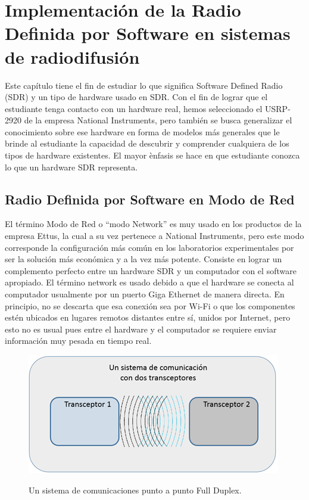 
\chapter{Implementación de la Radio Definida por Software en sistemas de radiodifusión}

Este capítulo tiene el fin de estudiar lo que significa Software Defined Radio (SDR) y un tipo de hardware usado en SDR. Con el fin de lograr que el estudiante tenga contacto con un hardware real, hemos seleccionado el USRP-2920 de la empresa National Instruments, pero también se busca generalizar el conocimiento sobre ese hardware en forma de modelos más generales que le brinde al estudiante la capacidad de descubrir y comprender cualquiera de los tipos de hardware existentes. El mayor ènfasis se hace en que estudiante conozca lo que un hardware SDR representa. 


\section{Radio Definida por Software en Modo de Red}

El término Modo de Red o “modo Network” es muy usado en los productos de la empresa Ettus, la cual a su vez pertenece a National Instruments, pero este modo corresponde la configuración más común en los laboratorios experimentales por ser la solución más económica y a la vez más potente. Consiste en lograr un complemento perfecto entre un hardware SDR y un computador con el software apropiado. El término network es usado debido a que el hardware se conecta al computador usualmente por un puerto Giga Ethernet de manera directa. En principio, no se descarta que esa conexión sea por Wi-Fi o que los componentes estén ubicados en lugares remotos distantes entre sí, unidos por Internet, pero esto no es usual pues entre el hardware y el computador se requiere enviar información muy pesada en tiempo real. \\


\begin{figure}[h!]
	\captionsetup{justification = raggedright, singlelinecheck = false}
	\caption{Un sistema de comunicaciones punto a punto Full Duplex.} 
	\centering
	\includegraphics[scale=0.8]{Imagenes/Full-duplex.png}
	\label{fig:Full-duplex}
\end{figure}

